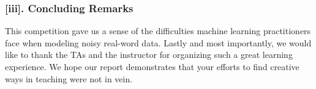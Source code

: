 \subsubsection*{[iii]. Concluding Remarks}
This competition gave us a sense of the difficulties machine learning practitioners face when modeling noisy real-word data. Lastly and most importantly, we would like to thank the TAs and the instructor for organizing such a great learning experience. We hope our report demonstrates that your efforts to find creative ways in teaching were not in vein.


















